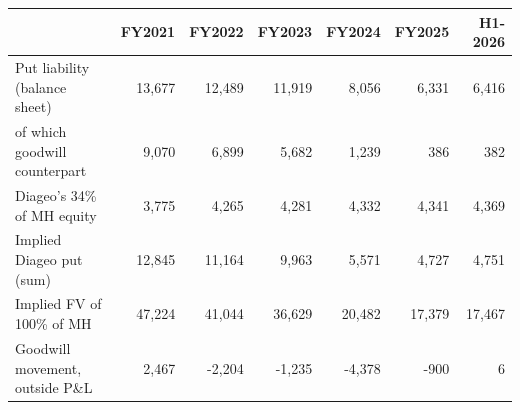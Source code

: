 \begin{tabular}{lrrrrrr}
\toprule
 & FY2021 & FY2022 & FY2023 & FY2024 & FY2025 & H1-2026 \\
\midrule
Put liability (balance sheet) & 13,677 & 12,489 & 11,919 & 8,056 & 6,331 & 6,416 \\
of which goodwill counterpart & 9,070 & 6,899 & 5,682 & 1,239 & 386 & 382 \\
Diageo's 34\% of MH equity & 3,775 & 4,265 & 4,281 & 4,332 & 4,341 & 4,369 \\
Implied Diageo put (sum) & 12,845 & 11,164 & 9,963 & 5,571 & 4,727 & 4,751 \\
Implied FV of 100\% of MH & 47,224 & 41,044 & 36,629 & 20,482 & 17,379 & 17,467 \\
Goodwill movement, outside P\&L & 2,467 & -2,204 & -1,235 & -4,378 & -900 & 6 \\
\bottomrule
\end{tabular}

